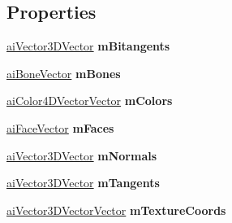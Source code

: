 \subsection*{Properties}
\begin{DoxyCompactItemize}
\item 
\hypertarget{structai_mesh_ab9521eb69dd3b3c1e46294f2d2f44d03}{\hyperlink{classai_vector3_d_vector}{ai\+Vector3\+D\+Vector} {\bfseries m\+Bitangents}}\label{structai_mesh_ab9521eb69dd3b3c1e46294f2d2f44d03}

\item 
\hypertarget{structai_mesh_a31b29ae64b218fbc23c4fc3baacdcaec}{\hyperlink{classai_bone_vector}{ai\+Bone\+Vector} {\bfseries m\+Bones}}\label{structai_mesh_a31b29ae64b218fbc23c4fc3baacdcaec}

\item 
\hypertarget{structai_mesh_a1c24880d0526abd3ffc4ecbf62f914d8}{\hyperlink{classai_color4_d_vector_vector}{ai\+Color4\+D\+Vector\+Vector} {\bfseries m\+Colors}}\label{structai_mesh_a1c24880d0526abd3ffc4ecbf62f914d8}

\item 
\hypertarget{structai_mesh_a48abbb813e0ed84ae2d198a7b1f27443}{\hyperlink{classai_face_vector}{ai\+Face\+Vector} {\bfseries m\+Faces}}\label{structai_mesh_a48abbb813e0ed84ae2d198a7b1f27443}

\item 
\hypertarget{structai_mesh_a1bf32f24d4bbe3529d07b530214a71c5}{\hyperlink{classai_vector3_d_vector}{ai\+Vector3\+D\+Vector} {\bfseries m\+Normals}}\label{structai_mesh_a1bf32f24d4bbe3529d07b530214a71c5}

\item 
\hypertarget{structai_mesh_a8486a18f3191119487decf9e45502340}{\hyperlink{classai_vector3_d_vector}{ai\+Vector3\+D\+Vector} {\bfseries m\+Tangents}}\label{structai_mesh_a8486a18f3191119487decf9e45502340}

\item 
\hypertarget{structai_mesh_a3c7c97f8a69de383a3e989fe5d89b114}{\hyperlink{classai_vector3_d_vector_vector}{ai\+Vector3\+D\+Vector\+Vector} {\bfseries m\+Texture\+Coords}}\label{structai_mesh_a3c7c97f8a69de383a3e989fe5d89b114}


\end{DoxyCompactItemize}
